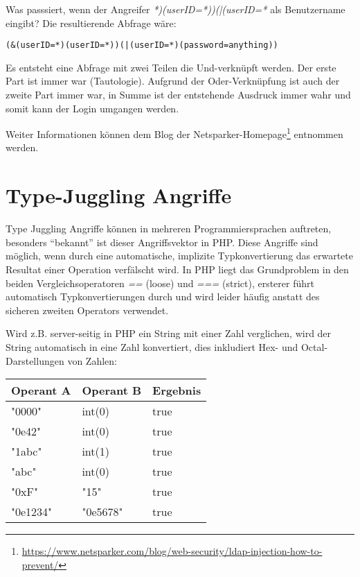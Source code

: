 Was passsiert, wenn der Angreifer \textit{*)(userID=*))(|(userID=*} als Benutzername eingibt? Die resultierende Abfrage wäre:

\begin{verbatim}
(&(userID=*)(userID=*))(|(userID=*)(password=anything))
\end{verbatim}

Es entsteht eine Abfrage mit zwei Teilen die Und-verknüpft werden. Der erste Part ist immer war (Tautologie). Aufgrund der Oder-Verknüpfung ist auch der zweite Part immer war, in Summe ist der entstehende Ausdruck immer wahr und somit kann der Login umgangen werden.

Weiter Informationen können dem Blog der Netsparker-Homepage\footnote{\url{https://www.netsparker.com/blog/web-security/ldap-injection-how-to-prevent/}} entnommen werden.

\section{Type-Juggling Angriffe}

Type Juggling Angriffe können in mehreren Programmiersprachen auftreten, besonders ``bekannt'' ist dieser Angriffsvektor in PHP. Diese Angriffe sind möglich, wenn durch eine automatische, implizite Typkonvertierung das erwartete Resultat einer Operation verfälscht wird. In PHP liegt das Grundproblem in den beiden Vergleichsoperatoren \textit{==} (loose) und \textit{===} (strict), ersterer führt automatisch Typkonvertierungen durch und wird leider häufig anstatt des sicheren zweiten Operators verwendet.

Wird z.B. server-seitig in PHP ein String mit einer Zahl verglichen, wird der String automatisch in eine Zahl konvertiert, dies inkludiert Hex- und Octal-Darstellungen von Zahlen:

\begin{table}[H]
	\begin{center}
\begin{tabular}{lll}
	\toprule
	Operant A & Operant B & Ergebnis \\
	\midrule
	"0000" & int(0) & true \\
	"0e42" & int(0) & true \\
	"1abc" & int(1) & true \\
	"abc"  & int(0) & true \\
	"0xF"  & "15"   & true \\
	"0e1234" & "0e5678" & true \\
	\bottomrule
\end{tabular}
\end{center}
\end{table}

